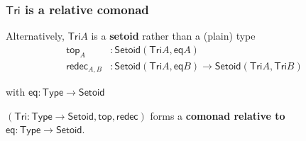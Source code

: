 \documentclass[
]
{beamer}
\newcommand{\constfont}[1]{\ensuremath{\mathsf{#1}}}
\newcommand{\Tri}{\constfont{Tri}}
\newcommand{\head}{\constfont{top}}
\newcommand{\tail}{\constfont{rest}}
\newcommand{\redec}{\constfont{redec}}
\newcommand{\shift}{\constfont{shift}}
\newcommand{\lift}{\constfont{lift}}
\newcommand{\subst}{\constfont{subst}}
\newcommand{\Setoid}{\constfont{Setoid}}
\newcommand{\eq}{\ensuremath{\mathsf{eq}}}
\newcommand{\Abs}{\constfont{abs}}
\newcommand{\Set}{\constfont{Type}}
\newcommand{\fat}[1]{\textbf{#1}}
\begin{document}
\begin{frame}
 \frametitle{$\Tri$ is a relative comonad}
  \begin{block}{Alternatively, $\Tri A$ is a \fat{setoid} rather than a (plain) type}
       \vspace{-2em}
           \begin{align*} 
                 \head_A &: \Setoid(\Tri A, \eq A) \\
                 \redec_{A,B} &: \Setoid(\Tri A,\eq B) \to \Setoid(\Tri A,\Tri B )
           \end{align*}
       
       
             with $\eq : \Set \to \Setoid$

  \end{block}

\pause
  \begin{lemma}
 $(\Tri : \Set\to\Setoid, \head, \redec)$ forms a \fat{comonad relative to} $\eq:\Set\to\Setoid$.
\end{lemma}




\end{frame}



\begin{comment}
\begin{frame}
 \frametitle{Towards \enquote{coalgebras} for the signature of $\Tri$}
 
  \begin{block}{Goal: define \enquote{coalgebra} s.t.\ $\Tri$ is (the terminal) one}
    More specifically:
    \begin{itemize}
     \item define a notion of \enquote{morphism} for destructor $\tail$
     \item requirement: want to capture interplay of $\tail$ and $\redec$:
       \[\tail\bigl(\redec~f~t\bigr) = \redec\bigl(\lift~f\bigr)(\tail~t)\]
    \end{itemize}
  \end{block}

 \begin{block}{Analogous situation for syntax:}
   For the lambda calculus with monadic substitution:
      \[ \subst~f~(\Abs~t) = \Abs~(\subst~(\shift~f)~t) \]
 \end{block}
\end{frame}
\end{comment}
\end{document}
